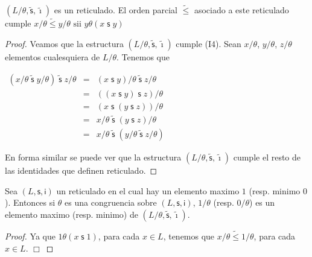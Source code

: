   \begin{lemma}
    \((L/\theta ,\mathsf{\tilde{s}},\mathsf{\tilde{\imath}})\) es un reticulado. El orden parcial \(\tilde{\leq}\) asociado a este reticulado cumple
    \(\displaystyle x/\theta \tilde{\leq}y/\theta \text{ sii }y\theta (x\mathsf{\;s\;}y) \)
  \end{lemma}
  \begin{proof}
    Veamos que la estructura \((L/\theta ,\mathsf{\tilde{s}},\mathsf{\tilde{\imath }})\) cumple (I4). Sean \(x/\theta \), \(y/\theta \), \(z/\theta \) elementos cualesquiera de \(L/\theta \). Tenemos que

    \(\displaystyle \begin{array}{ccl} (x/\theta \mathsf{\;\tilde{s}\;}y/\theta )\;\mathsf{\tilde{s}}\;z/\theta & = & (x\mathsf{\;s\;}y)/\theta \;\mathsf{\tilde{s}}\;z/\theta \\ & = & ((x\mathsf{\;s\;}y)\;\mathsf{s}\;z)/\theta \\ & = & (x\mathsf{\;s\;}(y\;\mathsf{s}\;z))/\theta \\ & = & x/\theta \;\mathsf{\tilde{s}}\;(y\;\mathsf{s}\;z)/\theta \\ & = & x/\theta \mathsf{\;\tilde{s}\;}(y/\theta \;\mathsf{\tilde{s}} \;z/\theta ) \end{array} \)

    En forma similar se puede ver que la estructura \((L/\theta ,\mathsf{\tilde{s} },\mathsf{\tilde{\imath}})\) cumple el resto de las identidades que definen reticulado.
  \end{proof}

  \begin{corollary}
    Sea \((L,\mathsf{s},\mathsf{i})\) un reticulado en el cual hay un elemento maximo \(1\) (resp. minimo \(0\)). Entonces si \(\theta \) es una congruencia sobre \((L,\mathsf{s},\mathsf{i})\), \(1/\theta \) (resp. \(0/\theta \)) es un elemento maximo (resp. minimo) de \((L/\theta ,\mathsf{\tilde{s}},\mathsf{ \tilde{\imath}})\).
  \end{corollary}
  \begin{proof}
    Ya que \(1\theta (x\mathsf{\;s\;}1)\), para cada \(x\in L\), tenemos que \( x/\theta \tilde{\leq}1/\theta \), para cada \(x\in L\). \(\Box\)
  \end{proof}


